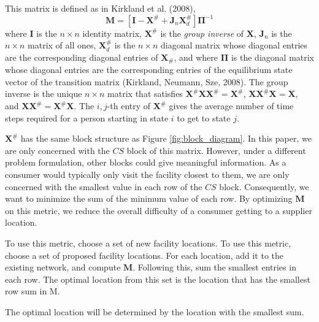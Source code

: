 \documentclass[twoside,twocolumn]{article}
\begin{document}
This matrix is defined as in Kirkland et al. (2008),
$$ \textbf{M} = [\textbf{I} - \textbf{X}^{\#} + \textbf{J}_{n}\textbf{X}_{d}^{\#}]\mathbf{\Pi}^{-1}$$
where $\textbf{I}$ is the $n \times n$ identity matrix, $\textbf{X}^{\#}$ is the {\em group inverse} of $\textbf{X}$, $\textbf{J}_{n}$ is the $n \times n$ matrix of all ones, $\textbf{X}_{d}^{\#}$ is the $n \times n$ diagonal matrix whose diagonal entries are the corresponding diagonal entries of $\textbf{X}_{\#}$, and where $\mathbf{\Pi}$ is the diagonal matrix whose diagonal entries are the corresponding entries of the equilibrium state vector of the transition matrix (Kirkland, Neumann, Sze, 2008).%
 The group inverse is the unique $n \times n$ matrix that satisfies $\textbf{X}^{\#}\textbf{X}\textbf{X}^{\#} = \textbf{X}^{\#}$, $\textbf{X}\textbf{X}^{\#}\textbf{X} = \textbf{X}$, and $\textbf{X}\textbf{X}^{\#} = \textbf{X}^{\#}\textbf{X}$.
The $i, j$-th entry of $\textbf{X}^{\#}$ gives the average number of time steps required for a person starting in state $i$ to get to state $j$.

 $\textbf{X}^{\#}$ has the same block structure as Figure \ref{fig:block_diagram}.
In this paper, we are only concerned with the $CS$ block of this matrix.
However, under a different problem formulation, other blocks could give meaningful information.
As a consumer would typically only visit the facility closest to them, we are only concerned with the smallest value in each row of the $CS$ block.
Consequently, we want to minimize the sum of the minimum value of each row.
By optimizing $\textbf{M}$ on this metric, we reduce the overall difficulty of a consumer getting to a supplier location.

To use this metric, choose a set of new facility locations. 
To use this metric, choose a set of proposed facility locations.
For each location, add it to the existing network, and compute $\textbf{M}$.
Following this, sum the smallest entries in each row.
The optimal location from this set is the location that has the smallest row sum in M.

The optimal location will be determined by the location with the smallest sum.
\end{document}
